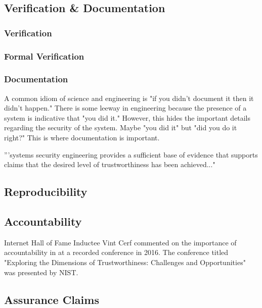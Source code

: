 \documentclass[../../main/main.tex]{subfiles}
\begin{document}
\subsection{Verification \& Documentation}\label{sssec:sseframework}

\subsubsection{Verification}
\subsubsection{Formal Verification}

\subsubsection{Documentation}


A common idiom of science and engineering is "if you didn't document it then it didn't happen."  There is some leeway in engineering because the presence of a system is indicative that "you did it." However, this hides the important details regarding the security of the system.  Maybe "you did it" but "did you do it right?"  This is where documentation is important. 

'''systems security engineering provides a sufficient base of evidence that supports claims that the desired level of trustworthiness has been achieved..."


\subsection{Reproducibility}\label{ssec:reproducibility}
\subsection{Accountability}\label{ssec:accountability}
Internet Hall of Fame Inductee Vint Cerf commented on the importance of accountability in  at a recorded conference in 2016.  The conference titled "Exploring the Dimensions of Trustworthiness: Challenges and Opportunities" was presented by NIST.  

\subsection{Assurance Claims}\label{ssec:assurance}
\end{document}
